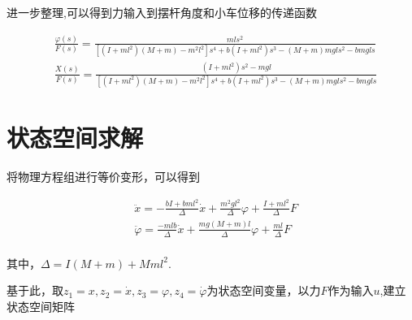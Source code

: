 进一步整理,可以得到力输入到摆杆角度和小车位移的传递函数

\begin{equation}
\begin{aligned}
&\frac{\varphi(s)}{F(s)}=\frac{mls^2}{[(I+ml^2)(M+m)-m^2l^2]s^4+b(I+ml^2)s^3-(M+m)mgls^2-bmgls}\\
&\frac{X(s)}{F(s)}=\frac{(I+ml^2)s^2-mgl}{[(I+ml^2)(M+m)-m^2l^2]s^4+b(I+ml^2)s^3-(M+m)mgls^2-bmgls}
\end{aligned}
\end{equation}

\section{状态空间求解}

将物理方程组进行等价变形，可以得到

\begin{equation}
\begin{aligned}
&\ddot x=-\frac{bI+bml^2}{\Delta}\dot x+\frac{m^2gl^2}{\Delta}\varphi+\frac{I+ml^2}{\Delta}F\\
&\ddot{\varphi}=\frac{-mlb}{\Delta}\dot x+\frac{mg(M+m)l}{\Delta}\varphi+\frac{ml}{\Delta}F\\
\end{aligned}
\end{equation}

其中，$\Delta=I(M+m)+Mml^2$.

基于此，取$z_1=x,z_2=\dot x,z_3=\varphi,z_4=\dot{\varphi}$为状态空间变量，以力$F$作为输入$u$,建立状态空间矩阵

